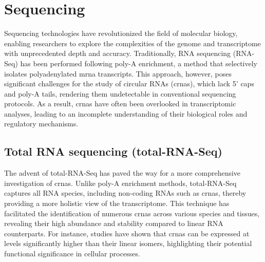 \section{Sequencing }

Sequencing technologies have revolutionized the field of molecular biology,
enabling researchers to explore the complexities of the genome and
transcriptome with unprecedented depth and accuracy.
Traditionally, RNA sequencing (RNA-Seq) has been performed following poly-A
enrichment, a method that selectively isolates polyadenylated \gls{mrna} transcripts.
This approach, however, poses significant challenges for the study of circular
RNAs (\glspl{crna}), which lack 5' caps and poly-A tails, rendering them
undetectable in conventional sequencing protocols\supercite{guo_expanded_2014}.
As a result, \glspl{crna} have often been overlooked in transcriptomic analyses,
leading to an incomplete understanding of their biological roles and regulatory
mechanisms.

\subsection{Total RNA sequencing (total-RNA-Seq)}
The advent of total-RNA-Seq has paved the way for a more comprehensive
investigation of \glspl{crna}.
Unlike poly-A enrichment methods, total-RNA-Seq captures all RNA species,
including non-coding RNAs such as \glspl{crna}, thereby providing a more
holistic view of the transcriptome\supercite{panda_identification_2017}.
This technique has facilitated the identification of numerous \glspl{crna}
across various species and tissues, revealing their high abundance and
stability compared to linear RNA
counterparts\supercite{liu_circular_2016,cao_expression_2018}.
For instance, studies have shown that \glspl{crna} can be expressed at levels
significantly higher than their linear isomers, highlighting their potential
functional significance in cellular processes\supercite{liu_circular_2016}.
